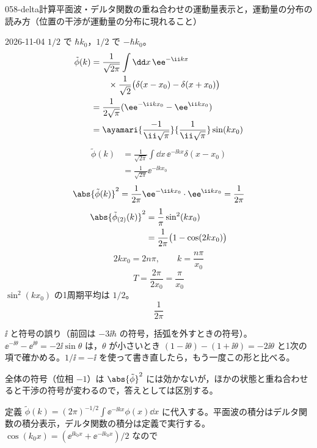 \documentclass[uplatex,dvipdfmx,a4paper,11pt]{jsarticle}
\begin{document}
\begin{mondai}{058-delta}{計算}{平面波・デルタ関数の重ね合わせの運動量表示と，運動量の分布の読み方（位置の干渉が運動量の分布に現れること）}
\begin{kotaeutsushi}{2026-11-04}
$1/2$ で $\hbar k_{0}$，$1/2$ で $-\hbar k_{0}$。
\begin{align*}
\tilde{\phi}(k)&=\frac{1}{\sqrt{2\pi}}\int\dd x\,\ee^{-\ii kx}\\
&\qquad\times\frac{1}{\sqrt{2}}\bigl(\delta(x-x_{0})-\delta(x+x_{0})\bigr)\\
&=\frac{1}{2\sqrt{\pi}}(\ee^{-\ii kx_{0}}-\ee^{\ii kx_{0}})\\
&=\ayamari{\frac{-1}{\ii\sqrt{\pi}}}{\frac{1}{\ii\sqrt{\pi}}}\sin(kx_{0})
\end{align*}
\begin{align*}
\tilde{\phi}(k)&=\frac{1}{\sqrt{2\pi}}\int\dd x\,\ee^{-\ii kx}\delta(x-x_{0})\\
&=\frac{1}{\sqrt{2\pi}}\ee^{-\ii kx_{0}}
\end{align*}
\[ \abs{\tilde{\phi}(k)}^{2}=\frac{1}{2\pi}\ee^{-\ii kx_{0}}\cdot\ee^{\ii kx_{0}}=\frac{1}{2\pi} \]
\begin{align*}
\abs{\tilde{\phi}_{(2)}(k)}^{2}&=\frac{1}{\pi}\sin^{2}(kx_{0})\\
&=\frac{1}{2\pi}\bigl(1-\cos(2kx_{0})\bigr)
\end{align*}
\[ 2kx_{0}=2n\pi,\qquad k=\frac{n\pi}{x_{0}} \]
\[ T=\frac{2\pi}{2x_{0}}=\frac{\pi}{x_{0}} \]
$\sin^{2}(kx_{0})$ の1周期平均は $1/2$。
\[ \frac{1}{2\pi} \]
\end{kotaeutsushi}
\begin{kizuki}
\item {} $\ii$ と符号の誤り（前回は $-3\ii\hbar$ の符号，括弧を外すときの符号）。$\ee^{-\ii\theta}-\ee^{\ii\theta}=-2\ii\sin\theta$ は，$\theta$ が小さいとき $(1-\ii\theta)-(1+\ii\theta)=-2\ii\theta$ と1次の項で確かめる。$1/\ii=-\ii$ を使って書き直したら，もう一度この形と比べる。
\item 全体の符号（位相 $-1$）は $\abs{\tilde{\phi}}^{2}$ には効かないが，ほかの状態と重ね合わせると干渉の符号が変わるので，答えとしては区別する。
\end{kizuki}
\begin{tadashii}
\houshin 定義 $\tilde{\phi}(k)=(2\pi)^{-1/2}\int\ee^{-\ii kx}\phi(x)\dd x$ に代入する。平面波の積分はデルタ関数の積分表示，デルタ関数の積分は定義で実行する。
\keisan {} $\cos(k_{0}x)=(\ee^{\ii k_{0}x}+\ee^{-\ii k_{0}x})/2$ なので

\end{tadashii}
\end{mondai}
\end{document}
